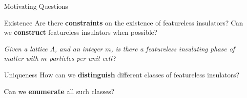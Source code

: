\begin{frame}{Motivating Questions}
\vskip -1.5cm
\begin{block}{Existence}
Are there \textbf{constraints} on the existence of featureless insulators?
Can we \textbf{construct} featureless insulators when possible?
\\\vspace{1em}
{\em
Given a %
lattice $\Lambda$, and an integer $m$, is there a featureless insulating phase of matter with $m$ particles per unit cell? 

}
\end{block}
\begin{block}{Uniqueness}
How can we \textbf{distinguish} different classes of featureless insulators?

Can we \textbf{enumerate} all such classes?\\
\end{block}
\end{frame}